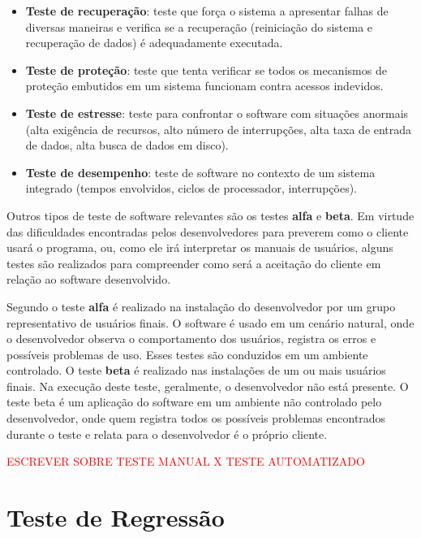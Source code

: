 \begin{itemize}
    
    \item \textbf{Teste de recuperação}: teste que força o sistema a apresentar falhas de diversas maneiras e verifica se a recuperação (reiniciação do sistema e recuperação de dados) é adequadamente executada.
    
    \item \textbf{Teste de proteção}: teste que tenta verificar se todos os mecanismos de proteção embutidos em um sistema funcionam contra acessos indevidos.
    
    \item \textbf{Teste de estresse}: teste para confrontar o software com situações anormais (alta exigência de recursos, alto número de interrupções, alta taxa de entrada de dados, alta busca de dados em disco).
    
    \item \textbf{Teste de desempenho}: teste de software no contexto de um sistema integrado (tempos envolvidos, ciclos de processador, interrupções).

\end{itemize}

Outros tipos de teste de software relevantes são os testes \textbf{alfa} e \textbf{beta}. Em virtude das dificuldades encontradas pelos desenvolvedores para preverem como o cliente usará o programa, ou, como ele irá interpretar os manuais de usuários, alguns testes são realizados para compreender como será a aceitação do cliente em relação ao software desenvolvido. 

Segundo  o teste \textbf{alfa} é realizado na instalação do desenvolvedor por um grupo representativo de usuários finais. O software é usado em um cenário natural, onde o desenvolvedor observa o comportamento dos usuários, registra os erros e possíveis problemas de uso. Esses testes são conduzidos em um ambiente controlado. O teste \textbf{beta} é realizado nas instalações de um ou mais usuários finais. Na execução deste teste, geralmente, o desenvolvedor não está presente. O teste beta é um aplicação do software em um ambiente não controlado pelo desenvolvedor, onde quem registra todos os possíveis problemas encontrados durante o teste e relata para o desenvolvedor é o próprio cliente.

\textcolor{red}{ESCREVER SOBRE TESTE MANUAL X TESTE AUTOMATIZADO}


\section{Teste de Regressão}\label{sec:testesregressao}

